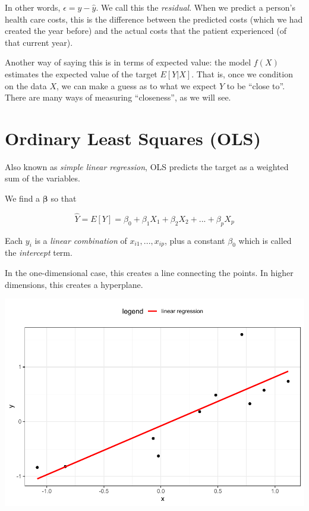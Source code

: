 \documentclass[openany]{book}
\begin{document}
In other words, \(\epsilon = y - \hat{y}\). We call this the \emph{residual}. When we predict a person's health care costs, this is the difference between the predicted costs (which we had created the year before) and the actual costs that the patient experienced (of that current year).

Another way of saying this is in terms of expected value: the model \(f(X)\) estimates the expected value of the target \(E[Y|X]\). That is, once we condition on the data \(X\), we can make a guess as to what we expect \(Y\) to be ``close to''. There are many ways of measuring ``closeness'', as we will see.

\hypertarget{ordinary-least-squares-ols}{%
\section{Ordinary Least Squares (OLS)}\label{ordinary-least-squares-ols}}

Also known as \emph{simple linear regression}, OLS predicts the target as a weighted sum of the variables.

We find a \(\mathbf{\beta}\) so that

\[
\hat{Y} = E[Y] =  \beta_0 + \beta_1 X_1 + \beta_2 X_2 + ... + \beta_p X_p
\]

Each \(y_i\) is a \emph{linear combination} of \(x_{i1}, ..., x_{ip}\), plus a constant \(\beta_0\) which is called the \emph{intercept} term.

In the one-dimensional case, this creates a line connecting the points. In higher dimensions, this creates a hyperplane.

\includegraphics{05-linear-models_files/figure-latex/unnamed-chunk-2-1.pdf}
\end{document}
